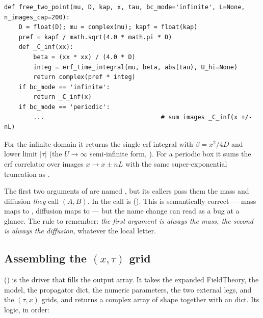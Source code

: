 \begin{lstlisting}
def free_two_point(mu, D, kap, x, tau, bc_mode='infinite', L=None, n_images_cap=200):
    D = float(D); mu = complex(mu); kapf = float(kap)
    pref = kapf / math.sqrt(4.0 * math.pi * D)
    def _C_inf(xx):
        beta = (xx * xx) / (4.0 * D)
        integ = erf_time_integral(mu, beta, abs(tau), U_hi=None)
        return complex(pref * integ)
    if bc_mode == 'infinite':
        return _C_inf(x)
    if bc_mode == 'periodic':
        ...                                # sum images _C_inf(x +/- nL)
\end{lstlisting}

For the infinite domain it returns the single erf integral with
$\beta=x^{2}/4D$ and lower limit $|\tau|$ (the $U\to\infty$ semi-infinite form,
). For a periodic box it sums the erf correlator over images
$x\to x\pm nL$ with the same super-exponential truncation as .

\begin{gotcha}
The first two arguments of  are named , but
its callers pass them the mass and diffusion \emph{they} call $(A,B)$. In
 the call is
 (). This
is semantically correct --- mass maps to , diffusion maps to 
--- but the name change can read as a bug at a glance. The rule to remember:
\emph{the first argument is always the mass, the second is always the
diffusion}, whatever the local letter.
\end{gotcha}

\subsection{Assembling the $(x,\tau)$ grid}

 () is
the driver that fills the output array. It takes the expanded FieldTheory, the
model, the propagator dict, the numeric parameters, the two external legs, and
the $(\tau,x)$ grids, and returns a complex array of shape
 together with an  dict.
Its logic, in order:


